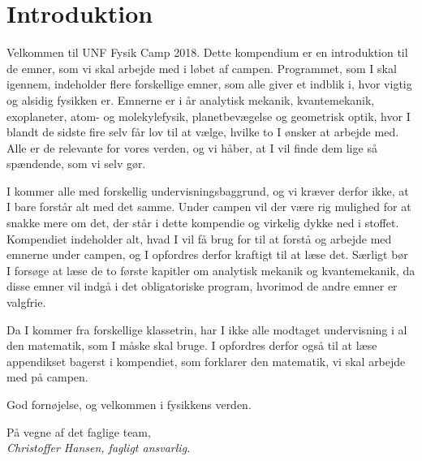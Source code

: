 \chapter*{Introduktion}
\label{cha:introduktion}

Velkommen til UNF Fysik Camp 2018. Dette kompendium er en introduktion
til de emner, som vi skal arbejde med i løbet af campen. Programmet,
som I skal igennem, indeholder flere forskellige emner, som alle
giver et indblik i, hvor vigtig og alsidig fysikken er. Emnerne er i år analytisk mekanik, kvantemekanik, exoplaneter, atom- og molekylefysik, planetbevægelse og geometrisk optik, hvor I blandt de sidste fire selv får lov til at vælge, hvilke to I ønsker at arbejde med. Alle er de relevante for vores verden, og vi håber, at I
vil finde dem lige så spændende, som vi selv gør.

I kommer alle med forskellig undervisningsbaggrund, og vi kræver
derfor ikke, at I bare forstår alt med det samme. Under campen vil der
være rig mulighed for at snakke mere om det, der står i dette
kompendie og virkelig dykke ned i stoffet. Kompendiet indeholder alt,
hvad I vil få brug for til at forstå og arbejde med emnerne under
campen, og I opfordres derfor kraftigt til at læse det. Særligt bør I
forsøge at læse de to første kapitler om analytisk mekanik og kvantemekanik,
da disse emner vil indgå i det obligatoriske program, hvorimod de
andre emner er valgfrie.

Da I kommer fra forskellige klassetrin, har I ikke alle modtaget
undervisning i al den matematik, som I måske skal bruge. I opfordres
derfor også til at læse appendikset bagerst i kompendiet, som
forklarer den matematik, vi skal arbejde med på campen.

God fornøjelse, og velkommen i fysikkens verden.

\begin{flushright}
På vegne af det faglige team, \\
\textit{Christoffer Hansen, fagligt ansvarlig. } 
\end{flushright}

